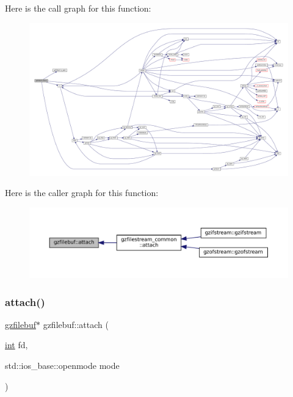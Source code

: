 Here is the call graph for this function\+:
\nopagebreak
\begin{figure}[H]
\begin{center}
\leavevmode
\includegraphics[width=350pt]{classgzfilebuf_a3ececdeaa35a8b606182cc23c9908891_cgraph}
\end{center}
\end{figure}
Here is the caller graph for this function\+:
\nopagebreak
\begin{figure}[H]
\begin{center}
\leavevmode
\includegraphics[width=350pt]{classgzfilebuf_a3ececdeaa35a8b606182cc23c9908891_icgraph}
\end{center}
\end{figure}
\mbox{\label{classgzfilebuf_a72889233c00bfd297ca01723cc4ed8fc}} 
\subsubsection{\texorpdfstring{attach()}{attach()}\hspace{0.1cm}{\footnotesize\ttfamily [2/2]}}
{\footnotesize\ttfamily \mbox{\hyperlink{classgzfilebuf}{gzfilebuf}}$\ast$ gzfilebuf\+::attach (\begin{DoxyParamCaption}\item[{\mbox{\hyperlink{ioapi_8h_a787fa3cf048117ba7123753c1e74fcd6}{int}}}]{fd,  }\item[{std\+::ios\+\_\+base\+::openmode}]{mode }\end{DoxyParamCaption})}



